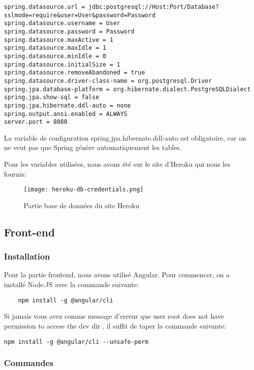 \clearpage

\begin{lstlisting}
spring.datasource.url = jdbc:postgresql://Host:Port/Database?sslmode=require&user=User&password=Password
spring.datasource.username = User
spring.datasource.password = Password
spring.datasource.maxActive = 1
spring.datasource.maxIdle = 1
spring.datasource.minIdle = 0
spring.datasource.initialSize = 1
spring.datasource.removeAbandoned = true
spring.datasource.driver-class-name = org.postgresql.Driver
spring.jpa.database-platform = org.hibernate.dialect.PostgreSQLDialect
spring.jpa.show-sql = false
spring.jpa.hibernate.ddl-auto = none
spring.output.ansi.enabled = ALWAYS
server.port = 8080
\end{lstlisting}

La variable de configuration \og{}spring.jpa.hibernate.ddl-auto\fg{} est obligatoire, car on ne veut pas que Spring génère automatiquement les tables.

Pour les variables utilisées, nous avons été sur le site d'Heroku qui nous les fournis:
\begin{figure}[ht]
	\centering
	\texttt{[image: heroku-db-credentials.png]}
	\caption{Partie base de données du site Heroku}
\end{figure}

\subsection{Front-end}
\subsubsection{Installation}

Pour la partie frontend, nous avons utilisé Angular. Pour commencer, on a installé Node.JS avec la commande suivante: 
\begin{lstlisting}
	npm install -g @angular/cli
\end{lstlisting}

Si jamais vous avez comme message d'erreur que \og{}user root does not have permission to access the dev dir \fg{}, il suffit de taper la commande suivante:
\begin{lstlisting}
npm install -g @angular/cli --unsafe-perm
\end{lstlisting}

\subsubsection{Commandes}

